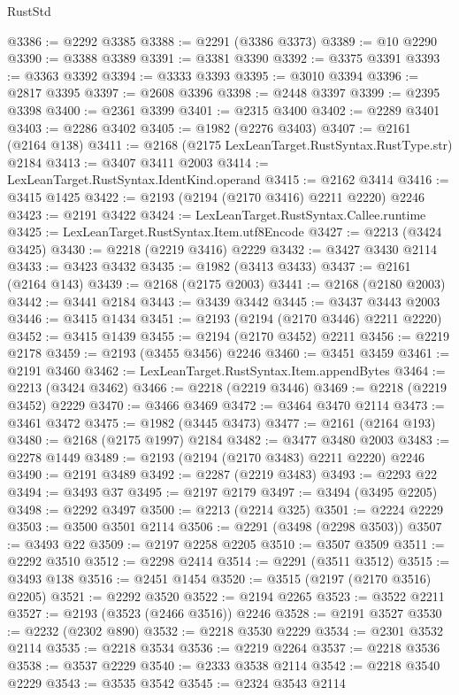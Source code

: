 \begin{lexlean}{RustStd}
\begin{coremodule}
@3386 := @2292 @3385
@3388 := @2291 (@3386 @3373)
@3389 := @10 @2290
@3390 := @3388 @3389
@3391 := @3381 @3390
@3392 := @3375 @3391
@3393 := @3363 @3392
@3394 := @3333 @3393
@3395 := @3010 @3394
@3396 := @2817 @3395
@3397 := @2608 @3396
@3398 := @2448 @3397
@3399 := @2395 @3398
@3400 := @2361 @3399
@3401 := @2315 @3400
@3402 := @2289 @3401
@3403 := @2286 @3402
@3405 := @1982 (@2276 @3403)
@3407 := @2161 (@2164 @138)
@3411 := @2168 (@2175 LexLeanTarget.RustSyntax.RustType.str) @2184
@3413 := @3407 @3411 @2003
@3414 := LexLeanTarget.RustSyntax.IdentKind.operand
@3415 := @2162 @3414
@3416 := @3415 @1425
@3422 := @2193 (@2194 (@2170 @3416) @2211 @2220) @2246
@3423 := @2191 @3422
@3424 := LexLeanTarget.RustSyntax.Callee.runtime
@3425 := LexLeanTarget.RustSyntax.Item.utf8Encode
@3427 := @2213 (@3424 @3425)
@3430 := @2218 (@2219 @3416) @2229
@3432 := @3427 @3430 @2114
@3433 := @3423 @3432
@3435 := @1982 (@3413 @3433)
@3437 := @2161 (@2164 @143)
@3439 := @2168 (@2175 @2003)
@3441 := @2168 (@2180 @2003)
@3442 := @3441 @2184
@3443 := @3439 @3442
@3445 := @3437 @3443 @2003
@3446 := @3415 @1434
@3451 := @2193 (@2194 (@2170 @3446) @2211 @2220)
@3452 := @3415 @1439
@3455 := @2194 (@2170 @3452) @2211
@3456 := @2219 @2178
@3459 := @2193 (@3455 @3456) @2246
@3460 := @3451 @3459
@3461 := @2191 @3460
@3462 := LexLeanTarget.RustSyntax.Item.appendBytes
@3464 := @2213 (@3424 @3462)
@3466 := @2218 (@2219 @3446)
@3469 := @2218 (@2219 @3452) @2229
@3470 := @3466 @3469
@3472 := @3464 @3470 @2114
@3473 := @3461 @3472
@3475 := @1982 (@3445 @3473)
@3477 := @2161 (@2164 @193)
@3480 := @2168 (@2175 @1997) @2184
@3482 := @3477 @3480 @2003
@3483 := @2278 @1449
@3489 := @2193 (@2194 (@2170 @3483) @2211 @2220) @2246
@3490 := @2191 @3489
@3492 := @2287 (@2219 @3483)
@3493 := @2293 @22
@3494 := @3493 @37
@3495 := @2197 @2179
@3497 := @3494 (@3495 @2205)
@3498 := @2292 @3497
@3500 := @2213 (@2214 @325)
@3501 := @2224 @2229
@3503 := @3500 @3501 @2114
@3506 := @2291 (@3498 (@2298 @3503))
@3507 := @3493 @22
@3509 := @2197 @2258 @2205
@3510 := @3507 @3509
@3511 := @2292 @3510
@3512 := @2298 @2414
@3514 := @2291 (@3511 @3512)
@3515 := @3493 @138
@3516 := @2451 @1454
@3520 := @3515 (@2197 (@2170 @3516) @2205)
@3521 := @2292 @3520
@3522 := @2194 @2265
@3523 := @3522 @2211
@3527 := @2193 (@3523 (@2466 @3516)) @2246
@3528 := @2191 @3527
@3530 := @2232 (@2302 @890)
@3532 := @2218 @3530 @2229
@3534 := @2301 @3532 @2114
@3535 := @2218 @3534
@3536 := @2219 @2264
@3537 := @2218 @3536
@3538 := @3537 @2229
@3540 := @2333 @3538 @2114
@3542 := @2218 @3540 @2229
@3543 := @3535 @3542
@3545 := @2324 @3543 @2114

\end{coremodule}
\end{lexlean}
